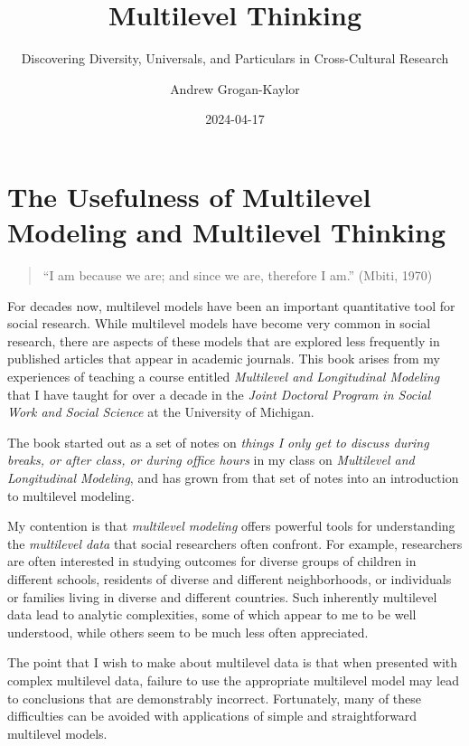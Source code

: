 \documentclass[
  letterpaper,
  DIV=11,
  numbers=noendperiod]{scrreprt}
\title{Multilevel Thinking}
\subtitle{Discovering Diversity, Universals, and Particulars in
Cross-Cultural Research}
\author{Andrew Grogan-Kaylor}
\date{2024-04-17}
\renewcommand*\contentsname{Table of contents}
\newcommand\contentsname{Table of contents}
\begin{document}
\maketitle

\renewcommand*\contentsname{Table of contents}
{
\hypersetup{linkcolor=}
\setcounter{tocdepth}{2}
\tableofcontents
}
\listoffigures
\listoftables
{}

\chapter{The Usefulness of Multilevel Modeling and Multilevel
Thinking}\label{the-usefulness-of-multilevel-modeling-and-multilevel-thinking}

\begin{quote}
``I am because we are; and since we are, therefore I am.'' (Mbiti, 1970)
\end{quote}

For decades now, multilevel models have been an important quantitative
tool for social research. While multilevel models have become very
common in social research, there are aspects of these models that are
explored less frequently in published articles that appear in academic
journals. This book arises from my experiences of teaching a course
entitled \emph{Multilevel and Longitudinal Modeling} that I have taught
for over a decade in the \emph{Joint Doctoral Program in Social Work and
Social Science} at the University of Michigan.

The book started out as a set of notes on \emph{things I only get to
discuss during breaks, or after class, or during office hours} in my
class on \emph{Multilevel and Longitudinal Modeling}, and has grown from
that set of notes into an introduction to multilevel modeling.

My contention is that \emph{multilevel modeling} offers powerful tools
for understanding the \emph{multilevel data} that social researchers
often confront. For example, researchers are often interested in
studying outcomes for diverse groups of children in different schools,
residents of diverse and different neighborhoods, or individuals or
families living in diverse and different countries. Such inherently
multilevel data lead to analytic complexities, some of which appear to
me to be well understood, while others seem to be much less often
appreciated.

The point that I wish to make about multilevel data is that when
presented with complex multilevel data, failure to use the appropriate
multilevel model may lead to conclusions that are demonstrably
incorrect. Fortunately, many of these difficulties can be avoided with
applications of simple and straightforward multilevel models.
\end{document}
